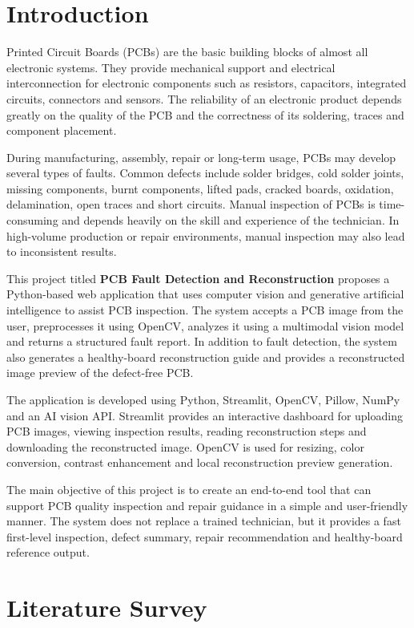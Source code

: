 \documentclass[12pt,a4paper]{report}
\begin{document}
\chapter{Introduction}

Printed Circuit Boards (PCBs) are the basic building blocks of almost all electronic systems. They provide mechanical support and electrical interconnection for electronic components such as resistors, capacitors, integrated circuits, connectors and sensors. The reliability of an electronic product depends greatly on the quality of the PCB and the correctness of its soldering, traces and component placement.

During manufacturing, assembly, repair or long-term usage, PCBs may develop several types of faults. Common defects include solder bridges, cold solder joints, missing components, burnt components, lifted pads, cracked boards, oxidation, delamination, open traces and short circuits. Manual inspection of PCBs is time-consuming and depends heavily on the skill and experience of the technician. In high-volume production or repair environments, manual inspection may also lead to inconsistent results.

This project titled \textbf{PCB Fault Detection and Reconstruction} proposes a Python-based web application that uses computer vision and generative artificial intelligence to assist PCB inspection. The system accepts a PCB image from the user, preprocesses it using OpenCV, analyzes it using a multimodal vision model and returns a structured fault report. In addition to fault detection, the system also generates a healthy-board reconstruction guide and provides a reconstructed image preview of the defect-free PCB.

The application is developed using Python, Streamlit, OpenCV, Pillow, NumPy and an AI vision API. Streamlit provides an interactive dashboard for uploading PCB images, viewing inspection results, reading reconstruction steps and downloading the reconstructed image. OpenCV is used for resizing, color conversion, contrast enhancement and local reconstruction preview generation.

The main objective of this project is to create an end-to-end tool that can support PCB quality inspection and repair guidance in a simple and user-friendly manner. The system does not replace a trained technician, but it provides a fast first-level inspection, defect summary, repair recommendation and healthy-board reference output.

\chapter{Literature Survey}
\end{document}
